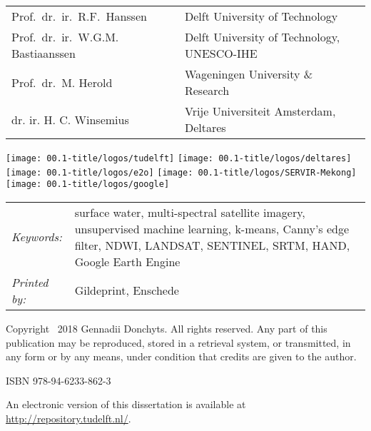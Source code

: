 \begin{titlepage}
\begin{tabular}{p{5cm}l}
	Prof.\ dr.\ ir.\ R.F.\ Hanssen & Delft University of Technology \\
	
	Prof.\ dr.\ ir.\ W.G.M. Bastiaanssen & Delft University of Technology, UNESCO-IHE \\
	
	Prof.\ dr.\ M. Herold & Wageningen University \& Research \\
		
	dr. ir. H. C. Winsemius & Vrije Universiteit Amsterdam, Deltares \\
	
\end{tabular}

\medskip

\vfill

\begin{center}
	\texttt{[image: 00.1-title/logos/tudelft]}
	\hspace{1em} 
	\texttt{[image: 00.1-title/logos/deltares]}
	\hspace{1em} \vspace{1em} 
	\texttt{[image: 00.1-title/logos/e2o]} 
	\hspace{1em}
	\texttt{[image: 00.1-title/logos/SERVIR-Mekong]} 
	\hspace{1em}
	\texttt{[image: 00.1-title/logos/google]} 
\end{center}
\vfill

\noindent
\begin{tabular}{@{}p{}@{}p{}}
	\textit{Keywords:} & {surface water, multi-spectral satellite imagery, unsupervised machine learning, k-means, Canny's edge filter, NDWI, LANDSAT, SENTINEL, SRTM, HAND, Google Earth Engine} \\[\medskipamount]
	
	\textit{Printed by:} & Gildeprint, Enschede \\[\medskipamount]
\end{tabular}

\vspace{4\bigskipamount}

\noindent Copyright \textcopyright\ 2018 Gennadii Donchyts. All rights reserved. Any part of this publication may be reproduced, stored in a retrieval system, or transmitted, in any form or by any means, under condition that credits are given to the author.

\medskip
\noindent ISBN 978-94-6233-862-3

\medskip
\noindent An electronic version of this dissertation is available at \\
\url{http://repository.tudelft.nl/}.

\end{titlepage}

